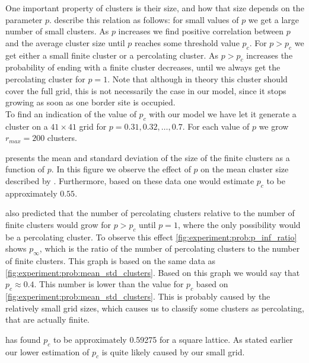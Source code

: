One important property of clusters is their size, and how that size depends on the parameter $p$. \textcite{kenzel1997physics} describe this relation as follows: for small values of $p$ we get a large number of small clusters. As $p$ increases we find positive correlation between $p$ and the average cluster size until $p$ reaches some threshold value $p_c$. For $p > p_c$ we get either a small finite cluster or a percolating cluster. As $p > p_c$ increases the probability of ending with a finite cluster decreases, until we always get the percolating cluster for $p =1 $. Note that although in theory this cluster should cover the full grid, this is not necessarily the case in our model, since it stops growing as soon as one border site is occupied. \\

To find an indication of the value of $p_c$ with our model we have let it generate a cluster on a $41 \times 41$ grid for $p = 0.31, 0.32, \dotsc, 0.7$. For each value of $p$ we grow $r_{max} = 200$ clusters. 

 presents the mean and standard deviation of the size of the finite clusters as a function of $p$. In this figure we observe the effect of $p$ on the mean cluster size described by \citeauthor{kenzel1997physics}. Furthermore, based on these data one would estimate $p_c$ to be approximately $0.55$. 

\citeauthor{kenzel1997physics} also predicted that the number of percolating clusters relative to the number of finite clusters would grow for $p > p_c$ until $p = 1$, where the only possibility would be a percolating cluster. To observe this effect \cref{fig:experiment:prob:p_inf_ratio} shows $p_\infty$, which is the ratio of the number of percolating clusters to the number of finite clusters. This graph is based on the same data as \cref{fig:experiment:prob:mean_std_clusters}. Based on this graph we would say that $p_c \approx 0.4$. This number is lower than the value for $p_c$ based on \cref{fig:experiment:prob:mean_std_clusters}. This is probably caused by the relatively small grid sizes, which causes us to classify some clusters as percolating, that are actually finite. 

\textcite{stauffer1994introduction} has found $p_c$ to be approximately \num{0.59275} for a square lattice. As stated earlier our lower estimation of $p_c$ is quite likely caused by our small grid. 
